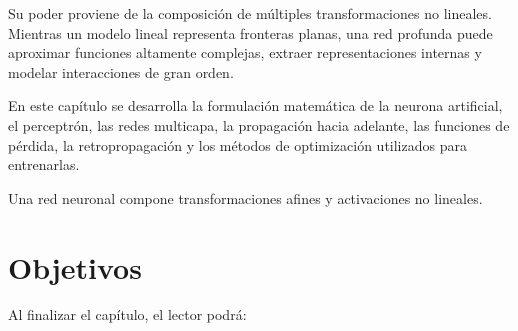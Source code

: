 \documentclass[
  spanish,
  10.5pt,
  letterpaper,
  DIV=11,
  numbers=noendperiod,
  oneside,
  open=any]{scrreprt}
\theoremstyle{definition}
\theoremstyle{definition}
\theoremstyle{plain}
\theoremstyle{remark}
\begin{document}
Su poder proviene de la composición de múltiples transformaciones no
lineales. Mientras un modelo lineal representa fronteras planas, una red
profunda puede aproximar funciones altamente complejas, extraer
representaciones internas y modelar interacciones de gran orden.

En este capítulo se desarrolla la formulación matemática de la neurona
artificial, el perceptrón, las redes multicapa, la propagación hacia
adelante, las funciones de pérdida, la retropropagación y los métodos de
optimización utilizados para entrenarlas.

\begin{tcolorbox}[enhanced jigsaw, arc=.35mm, bottomrule=.15mm, bottomtitle=1mm, breakable, colback=white, colbacktitle=quarto-callout-important-color!10!white, colframe=quarto-callout-important-color-frame, coltitle=black, left=2mm, leftrule=.75mm, opacityback=0, opacitybacktitle=0.6, rightrule=.15mm, title=\textcolor{quarto-callout-important-color}{\faExclamation}\hspace{0.5em}{Definición esencial}, titlerule=0mm, toprule=.15mm, toptitle=1mm]

Una red neuronal compone transformaciones afines y activaciones no
lineales.

\end{tcolorbox}

\section*{Objetivos}\label{objetivos-15}


Al finalizar el capítulo, el lector podrá:
\end{document}
